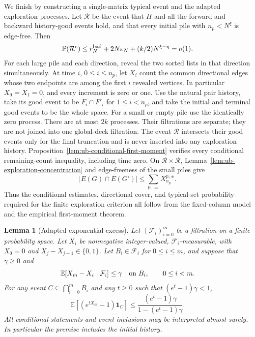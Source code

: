 \documentclass[11pt]{article}
\numberwithin{equation}{section}
\newtheorem{lemma}[lemma]{Lemma}
\newcommand{\E}{\mathbb E}
\newcommand{\Pp}{\mathbb P}
\newcommand{\1}{\mathbf 1}
\begin{document}
We finish by constructing a single-matrix typical event and the adapted
exploration processes.
Let \(\mathcal R\) be the event that \(H\) and all the forward
and backward history-good events hold, and that every initial pile
with \(n_p<N^\xi\) is edge-free. Then
\begin{equation}
\label{eq:ub-exploration-regularity-probability}
 \Pp(\mathcal R^c)
 \le r_N^{\rm bad}+2N\varepsilon_N+(k/2)N^{\xi-\eta}=o(1).
\end{equation}
For each large pile and each direction, reveal the two sorted lists
in that direction simultaneously. At time \(i\), \(0\le i\le n_p\),
let \(X_i\) count the common directional edges whose two endpoints
are among the first \(i\) revealed vertices. In particular
\(X_0=X_1=0\), and every increment is zero or one. Use the natural
pair history, take its good event to be \(F_i\cap F'_i\) for
\(1\le i<n_p\), and take the initial and terminal good events
to be the whole space. For a small or empty pile use the identically
zero process. There are at most \(2k\) processes.
Their filtrations are separate; they are not joined into one
global-deck filtration. The event \(\mathcal R\) intersects their
good events only for the final truncation and is never inserted
into any exploration history.
Proposition~\ref{lem:ub-conditional-first-moment} verifies every
conditional remaining-count inequality, including time zero.
On \(\mathcal R\times\mathcal R\),
Lemma~\ref{lem:ub-exploration-concentration} and edge-freeness of
the small piles give
\[
 |E(G)\cap E(G')|\le\sum_{p,\,\pm}X^{p,\pm}_{n_p}.
\]
Thus the conditional estimates, directional cover, and typical-set
probability required for the finite exploration criterion all follow
from the fixed-column model and the empirical first-moment theorem.

\begin{lemma}[Adapted exponential excess]
\label{lem:ub-portenko-exponential-moment}
Let $(\mathcal F_i)_{i=0}^m$ be a filtration on a finite probability
space. Let $X_i$ be nonnegative integer-valued, $\mathcal F_i$-measurable,
with $X_0=0$ and $X_j-X_{j-1}\in\{0,1\}$.
Let $B_i\in\mathcal F_i$ for $0\le i\le m$, and suppose that
$\gamma\ge0$ and
\begin{equation}
\label{eq:ub-adapted-tail-premise}
 \E[X_m-X_i\mid\mathcal F_i]\le\gamma
 \quad\hbox{on }B_i,\qquad 0\le i<m.
\end{equation}
For any event $C\subseteq\bigcap_{i=0}^mB_i$ and any $t\ge0$ such
that $(e^t-1)\gamma<1$,
\begin{equation}
\label{eq:ub-adapted-excess-bound}
 \E[(e^{tX_m}-1)\1_C]
 \le\frac{(e^t-1)\gamma}{1-(e^t-1)\gamma}.
\end{equation}
All conditional statements and event inclusions may be interpreted
almost surely. In particular the premise includes the initial history.
\end{lemma}
\end{document}
